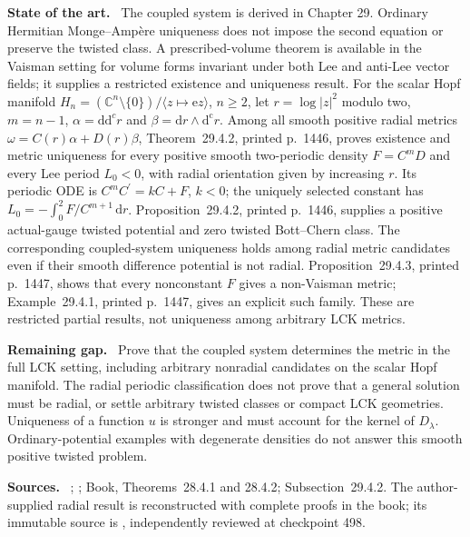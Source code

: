 \documentclass[11pt]{article}
\newcommand{\ddc}{\mathrm d\mathrm d^c}
\newcommand{\field}[1]{\par\medskip\noindent\textbf{#1.}\ }
\begin{document}
\field{State of the art} The coupled system is derived in Chapter 29. Ordinary Hermitian Monge--Amp\`ere uniqueness does not impose the second equation or preserve the twisted class. A prescribed-volume theorem is available in the Vaisman setting for volume forms invariant under both Lee and anti-Lee vector fields; it supplies a restricted existence and uniqueness result. For the scalar Hopf manifold $H_n=(\mathbb C^n\setminus\{0\})/\langle z\mapsto\mathrm e z\rangle$, $n\geq2$, let $r=\log|z|^2$ modulo two, $m=n-1$, $\alpha=\ddc r$ and $\beta=\mathrm dr\wedge\mathrm d^{\mathrm c}r$. Among all smooth positive radial metrics $\omega=C(r)\alpha+D(r)\beta$, Theorem~29.4.2, printed p.~1446, proves existence and metric uniqueness for every positive smooth two-periodic density $F=C^mD$ and every Lee period $L_0<0$, with radial orientation given by increasing $r$. Its periodic ODE is $C^mC^{\prime}=kC+F$, $k<0$; the uniquely selected constant has $L_0=-\int_0^2F/C^{m+1}\,\mathrm dr$. Proposition~29.4.2, printed p.~1446, supplies a positive actual-gauge twisted potential and zero twisted Bott--Chern class. The corresponding coupled-system uniqueness holds among radial metric candidates even if their smooth difference potential is not radial. Proposition~29.4.3, printed p.~1447, shows that every nonconstant $F$ gives a non-Vaisman metric; Example~29.4.1, printed p.~1447, gives an explicit such family. These are restricted partial results, not uniqueness among arbitrary LCK metrics.
\field{Remaining gap} Prove that the coupled system determines the metric in the full LCK setting, including arbitrary nonradial candidates on the scalar Hopf manifold. The radial periodic classification does not prove that a general solution must be radial, or settle arbitrary twisted classes or compact LCK geometries. Uniqueness of a function $u$ is stronger and must account for the kernel of $D_\lambda$. Ordinary-potential examples with degenerate densities do not answer this smooth positive twisted problem.
\field{Sources} \cite[Question 47.56(3)]{OV24LCK}; \cite[Theorem 4.1 and Lemmas 4.2--4.4, arXiv version]{OV24Vaisman}; Book, Theorems~28.4.1 and 28.4.2; Subsection~29.4.2. The author-supplied radial result is reconstructed with complete proofs in the book; its immutable source is , independently reviewed at checkpoint 498.
\end{document}
